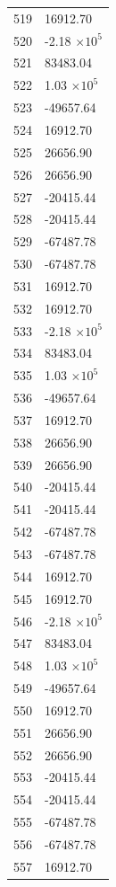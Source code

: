 \documentclass[a4paper,11pt]{article}
\begin{document}
\begin{center}
\begin{longtable}{|R{1.5cm}|R{2.5cm}|}
  519 &     16912.70 \\
  520 &        -2.18 $\times 10^{           5}$ \\
  521 &     83483.04 \\
  522 &         1.03 $\times 10^{           5}$ \\
  523 &    -49657.64 \\
  524 &     16912.70 \\
  525 &     26656.90 \\
  526 &     26656.90 \\
  527 &    -20415.44 \\
  528 &    -20415.44 \\
  529 &    -67487.78 \\
  530 &    -67487.78 \\
  531 &     16912.70 \\
  532 &     16912.70 \\
  533 &        -2.18 $\times 10^{           5}$ \\
  534 &     83483.04 \\
  535 &         1.03 $\times 10^{           5}$ \\
  536 &    -49657.64 \\
  537 &     16912.70 \\
  538 &     26656.90 \\
  539 &     26656.90 \\
  540 &    -20415.44 \\
  541 &    -20415.44 \\
  542 &    -67487.78 \\
  543 &    -67487.78 \\
  544 &     16912.70 \\
  545 &     16912.70 \\
  546 &        -2.18 $\times 10^{           5}$ \\
  547 &     83483.04 \\
  548 &         1.03 $\times 10^{           5}$ \\
  549 &    -49657.64 \\
  550 &     16912.70 \\
  551 &     26656.90 \\
  552 &     26656.90 \\
  553 &    -20415.44 \\
  554 &    -20415.44 \\
  555 &    -67487.78 \\
  556 &    -67487.78 \\
  557 &     16912.70 \\

\end{longtable}
\end{center}
\end{document}
